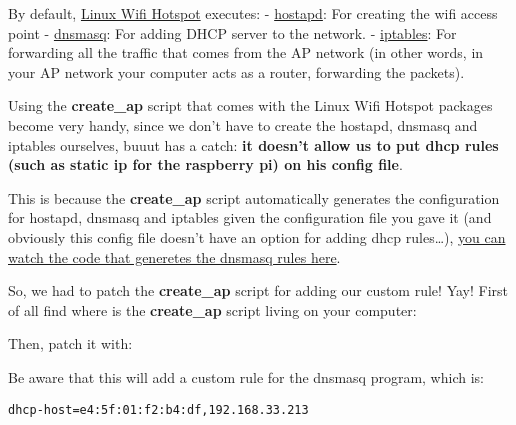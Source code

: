 By default,
\href{https://github.com/lakinduakash/linux-wifi-hotspot}{Linux Wifi
Hotspot} executes: -
\href{https://wiki.gentoo.org/wiki/Hostapd}{hostapd}: For creating the
wifi access point -
\href{https://wiki.archlinux.org/title/Dnsmasq}{dnsmasq}: For adding
DHCP server to the network. -
\href{https://wiki.archlinux.org/title/Iptables}{iptables}: For
forwarding all the traffic that comes from the AP network (in other
words, in your AP network your computer acts as a router, forwarding the
packets).

Using the \textbf{create\_ap} script that comes with the Linux Wifi
Hotspot packages become very handy, since we don't have to create the
hostapd, dnsmasq and iptables ourselves, buuut has a catch: \textbf{it
doesn't allow us to put dhcp rules (such as static ip for the raspberry
pi) on his config file}.

This is because the \textbf{create\_ap} script automatically generates
the configuration for hostapd, dnsmasq and iptables given the
configuration file you gave it (and obviously this config file doesn't
have an option for adding dhcp rules\ldots),
\href{https://github.com/lakinduakash/linux-wifi-hotspot/blob/d73242ab812284b5ed65275f630b8bc306b725c5/src/scripts/create_ap\#L1762}{you
can watch the code that generetes the dnsmasq rules here}.

So, we had to patch the \textbf{create\_ap} script for adding our custom
rule! Yay! First of all find where is the \textbf{create\_ap} script
living on your computer:

\begin{Shaded}
\begin{Highlighting}[]
\ExtensionTok{$}
\end{Highlighting}
\end{Shaded}

Then, patch it with:

\begin{Shaded}
\begin{Highlighting}[]
\ExtensionTok{$}\OperatorTok{\textless{}}
\end{Highlighting}
\end{Shaded}

Be aware that this will add a custom rule for the dnsmasq program, which
is:

\begin{verbatim}
dhcp-host=e4:5f:01:f2:b4:df,192.168.33.213
\end{verbatim}


